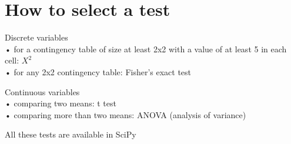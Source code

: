 \documentclass[]{project_plan}
\begin{document}
\newpage

\section{How to select a test}

Discrete variables\\
• for a contingency table of size at least 2x2 with a value of at least 5 in each cell: $X^2$\\
• for any 2x2 contingency table: Fisher's exact test

Continuous variables\\
• comparing two means: t test\\
• comparing more than two means: ANOVA (analysis of variance)

All these tests are available in SciPy
\end{document}
